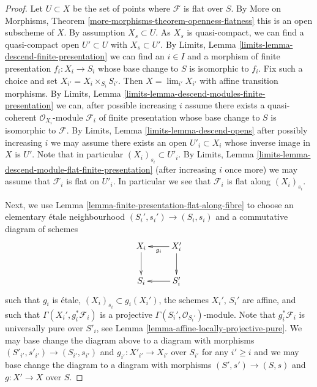 \documentclass[10pt,a4paper]{amsart}
\theoremstyle{plain}
\theoremstyle{definition}
\theoremstyle{remark}
\numberwithin{equation}{subsection}
\def\lim{\mathop{\mathrm{lim}}\nolimits}
\begin{document}
\begin{proof}
Let $U \subset X$ be the set of points where $\mathcal{F}$ is
flat over $S$. By
More on Morphisms, Theorem \ref{more-morphisms-theorem-openness-flatness}
this is an open subscheme of $X$. By assumption $X_s \subset U$.
As $X_s$ is quasi-compact, we can find a quasi-compact open
$U' \subset U$ with $X_s \subset U'$. By
Limits, Lemma \ref{limits-lemma-descend-finite-presentation}
we can find an $i \in I$ and a morphism of finite presentation
$f_i : X_i \to S_i$ whose base change to $S$ is isomorphic to $f_i$.
Fix such a choice and set $X_{i'} = X_i \times_{S_i} S_{i'}$.
Then $X = \lim_{i'} X_{i'}$ with affine transition morphisms. By
Limits, Lemma \ref{limits-lemma-descend-modules-finite-presentation}
we can, after possible increasing $i$ assume there exists a
quasi-coherent $\mathcal{O}_{X_i}$-module $\mathcal{F}_i$
of finite presentation whose base change to $S$ is isomorphic to
$\mathcal{F}$. By
Limits, Lemma \ref{limits-lemma-descend-opens}
after possibly increasing $i$ we may assume there exists an
open $U'_i \subset X_i$ whose inverse image in $X$ is $U'$.
Note that in particular $(X_i)_{s_i} \subset U'_i$. By
Limits, Lemma \ref{limits-lemma-descend-module-flat-finite-presentation}
(after increasing $i$ once more)
we may assume that $\mathcal{F}_i$ is flat on $U'_i$.
In particular we see that $\mathcal{F}_i$ is flat along $(X_i)_{s_i}$.

\medskip\noindent
Next, we use
Lemma \ref{lemma-finite-presentation-flat-along-fibre}
to choose an elementary \'etale neighbourhood
$(S_i', s_i') \to (S_i, s_i)$ and a commutative diagram of schemes
$$
\xymatrix{
X_i \ar[d] & X_i' \ar[l]^{g_i} \ar[d] \\
S_i & S_i' \ar[l]
}
$$
such that $g_i$ is \'etale, $(X_i)_{s_i} \subset g_i(X_i')$, the schemes
$X_i'$, $S_i'$ are affine, and such that
$\Gamma(X_i', g_i^*\mathcal{F}_i)$ is a projective
$\Gamma(S_i', \mathcal{O}_{S_i'})$-module.
Note that $g_i^*\mathcal{F}_i$ is universally pure over $S'_i$, see
Lemma \ref{lemma-affine-locally-projective-pure}.
We may base change the diagram above to a diagram with morphisms
$(S'_{i'}, s'_{i'}) \to (S_{i'}, s_{i'})$ and
$g_{i'} : X'_{i'} \to X_{i'}$ over $S_{i'}$
for any $i' \geq i$ and we may base change the diagram to a diagram
with morphisms $(S', s') \to (S, s)$ and $g : X' \to X$ over $S$.


\end{proof}
\end{document}
